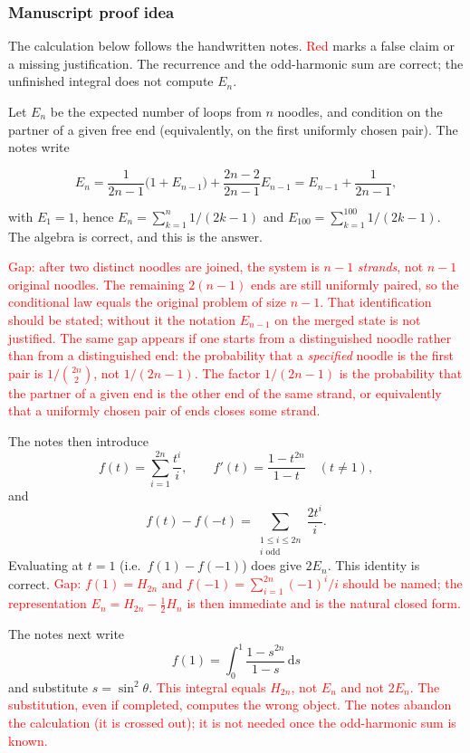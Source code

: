 \documentclass[11pt,a4paper]{article}
\newcommand{\mserr}[1]{\textcolor{red}{#1}}
\begin{document}
\subsubsection{Manuscript proof idea}

The calculation below follows the handwritten notes. \mserr{Red} marks a false claim or a missing justification. The recurrence and the odd-harmonic sum are correct; the unfinished integral does not compute \(E_{n}\).

Let \(E_{n}\) be the expected number of loops from \(n\) noodles, and condition on the partner of a given free end (equivalently, on the first uniformly chosen pair). The notes write

\[
E_{n}
=
\frac{1}{2n-1}\bigl(1+E_{n-1}\bigr)
+
\frac{2n-2}{2n-1}E_{n-1}
=
E_{n-1}+\frac{1}{2n-1},
\]

with \(E_{1}=1\), hence \(E_{n}=\sum_{k=1}^{n}1/(2k-1)\) and \(E_{100}=\sum_{k=1}^{100}1/(2k-1)\). The algebra is correct, and this is the answer.

\mserr{Gap: after two distinct noodles are joined, the system is \(n-1\) \emph{strands}, not \(n-1\) original noodles. The remaining \(2(n-1)\) ends are still uniformly paired, so the conditional law equals the original problem of size \(n-1\). That identification should be stated; without it the notation \(E_{n-1}\) on the merged state is not justified. The same gap appears if one starts from a distinguished noodle rather than from a distinguished end: the probability that a \emph{specified} noodle is the first pair is \(1/\binom{2n}{2}\), not \(1/(2n-1)\). The factor \(1/(2n-1)\) is the probability that the partner of a given end is the other end of the same strand, or equivalently that a uniformly chosen pair of ends closes some strand.}

The notes then introduce
\[
f(t)
=
\sum_{i=1}^{2n}\frac{t^{i}}{i},
\qquad
f'(t)
=
\frac{1-t^{2n}}{1-t}
\quad(t\neq 1),
\]
and
\[
f(t)-f(-t)
=
\sum_{\substack{1\le i\le 2n\\ i\text{ odd}}}\frac{2t^{i}}{i}.
\]
Evaluating at \(t=1\) (i.e.\ \(f(1)-f(-1)\)) does give \(2E_{n}\). This identity is correct. \mserr{Gap: \(f(1)=H_{2n}\) and \(f(-1)=\sum_{i=1}^{2n}(-1)^{i}/i\) should be named; the representation \(E_{n}=H_{2n}-\frac12 H_{n}\) is then immediate and is the natural closed form.}

The notes next write
\[
f(1)
=
\int_{0}^{1}\frac{1-s^{2n}}{1-s}\,\mathrm{d}s
\]
and substitute \(s=\sin^{2}\theta\). \mserr{This integral equals \(H_{2n}\), not \(E_{n}\) and not \(2E_{n}\). The substitution, even if completed, computes the wrong object. The notes abandon the calculation (it is crossed out); it is not needed once the odd-harmonic sum is known.}
\end{document}
